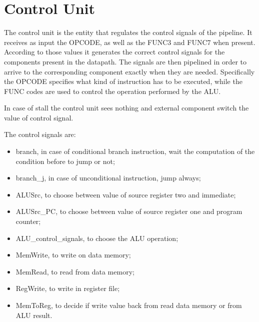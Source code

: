 %
\chapter{Control Unit}
\label{cha3}
The control unit is the entity that regulates the control signals of the pipeline. It receives as input the OPCODE, as well as the FUNC3 and FUNC7 when present. 
According to those values it generates the correct control signals for the components present in the datapath. The signals are then pipelined in order to 
arrive to the corresponding component exactly when they are needed. Specifically the OPCODE specifies what kind of instruction has to be executed, while the
FUNC codes are used to control the operation performed by the ALU.

In case of stall the control unit sees nothing and external component switch the value of control signal.

The control signals are:
\begin{itemize}
    \item branch, in case of conditional branch instruction, wait the computation of the condition before to jump or not;
    \item branch\_j, in case of unconditional instruction, jump always;
    \item ALUSrc, to choose between value of source register two and immediate;
    \item ALUSrc\_PC, to choose between value of source register one and program counter;
    \item ALU\_control\_signals, to choose the ALU operation;
    \item MemWrite, to write on data memory;
    \item MemRead, to read from data memory;
    \item RegWrite, to write in register file;
    \item MemToReg, to decide if write value back from read data memory or from ALU result.
\end{itemize}



